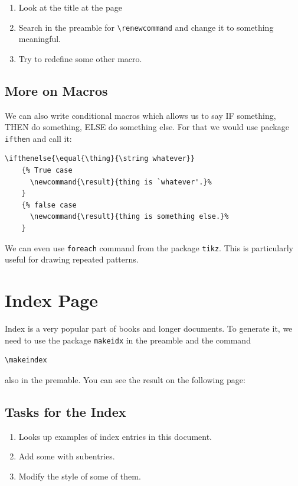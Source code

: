 \documentclass[a4paper,10pt]{report} %
\begin{document}
\begin{enumerate}
 \item Look at the title at the page \pageref{contents}
 \item Search in the preamble for \texttt{\textbackslash renewcommand} and change it to something meaningful.
 \item Try to redefine some other macro. 
\end{enumerate}


\subsection{More on Macros} 
 We can also write conditional macros which allows us to say IF something, THEN do something, ELSE do something else. For that we would use package \texttt{ifthen} and call it:
 

\begin{lstlisting}[language={[latex]tex},
    frame=single,basicstyle=\footnotesize]
    \ifthenelse{\equal{\thing}{\string whatever}}
    {% True case
      \newcommand{\result}{thing is `whatever'.}%
    }
    {% false case
      \newcommand{\result}{thing is something else.}%
    }
 \end{lstlisting}
 
 We can even use \texttt{foreach} command from the package \texttt{tikz}. This is particularly useful for drawing repeated patterns.
 
\section{Index Page}
Index is a very popular part of books and longer documents.
To generate it, we need to use the package \texttt{makeidx} in the preamble and the command 
\begin{lstlisting}[language={[latex]tex},
    frame=single,basicstyle=\footnotesize]
     \makeindex
\end{lstlisting}
also in the premable. You can see the result on the following page:


  \clearpage
  \label{index}  
  \printindex   
   
  \subsection{Tasks for the Index}
  \begin{enumerate}
   \item Looks up examples of index entries in this document.
   \item Add some with subentries. 
   \item Modify the style of some of them.
  \end{enumerate}
\end{document}
